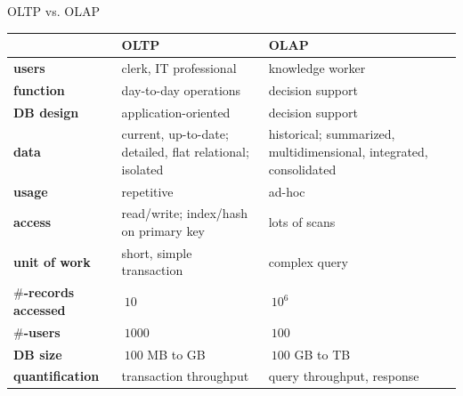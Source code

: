 \documentclass[aspectratio=169,t]{beamer}
\begin{document}
  { 
    \begin{frame}{OLTP vs. OLAP}
      \begin{tabularx}{\textwidth}{|l|X|X|}
      & \textbf{OLTP} & \textbf{OLAP} \\\hline
      \textbf{users} & clerk, IT professional & knowledge worker \\
      \textbf{function} & day-to-day operations & decision support \\
      \textbf{DB design} & application-oriented & decision support \\
      \textbf{data} & current, up-to-date; detailed, flat relational; isolated & historical; summarized, multidimensional, integrated, consolidated \\
      \textbf{usage} & repetitive & ad-hoc \\
      \textbf{access} & read/write; index/hash on primary key & lots of scans \\
      \textbf{unit of work} & short, simple transaction & complex query \\
      \textbf{$\#$-records accessed} & $~ 10$ & $~ 10^6$ \\
      \textbf{$\#$-users} & $~ 1000$ & $~ 100$ \\
      \textbf{DB size} & $~ 100$ MB to GB & $~ 100$ GB to TB \\
      \textbf{quantification} & transaction throughput & query throughput, response \\
      \end{tabularx}
    \end{frame}
  }
\end{document}
